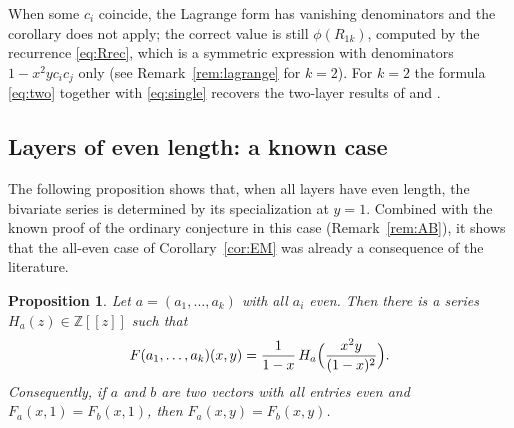 \documentclass[11pt]{amsart}
\newtheorem{proposition}[theorem]{Proposition}
\theoremstyle{definition}
\newcommand{\Z}{\mathbb{Z}}
\begin{document}
When some $c_i$ coincide, the Lagrange form has vanishing denominators and the corollary does not apply; the correct value is still $\phi(R_{1k})$, computed by the recurrence \eqref{eq:Rrec}, which is a symmetric expression with denominators $1-x^2yc_ic_j$ only (see Remark~\ref{rem:lagrange} for $k=2$). For $k=2$ the formula \eqref{eq:two} together with \eqref{eq:single} recovers the two-layer results of \cite[Theorem 6.7]{Egge2004} and \cite[Theorems 3.12--3.13]{EggeMansour2006}.

\subsection{Layers of even length: a known case}

The following proposition shows that, when all layers have even length, the bivariate series is determined by its specialization at $y=1$. Combined with the known proof of the ordinary conjecture in this case (Remark~\ref{rem:AB}), it shows that the all-even case of Corollary~\ref{cor:EM} was already a consequence of the literature.

\begin{proposition}\label{prop:even}
Let $a=(a_1,\dots,a_k)$ with all $a_i$ even. Then there is a series $H_a(z)\in\Z[[z]]$ such that
\begin{equation}\label{eq:even}
F(a_1,\dots,a_k)(x,y)=\frac1{1-x}\,H_a\Bigl(\frac{x^2y}{(1-x)^2}\Bigr).
\end{equation}
Consequently, if $a$ and $b$ are two vectors with all entries even and $F_a(x,1)=F_b(x,1)$, then $F_a(x,y)=F_b(x,y)$.
\end{proposition}
\end{document}
